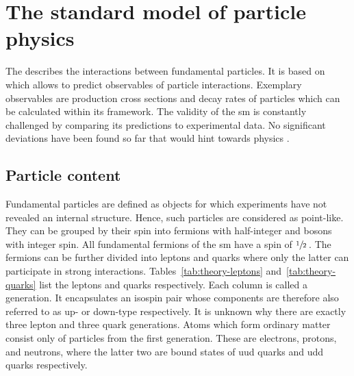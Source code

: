 \chapter{The standard model of particle physics}
\label{ch:theory}


The  describes the interactions between fundamental particles. It is based on  which allows to predict observables of particle interactions. Exemplary observables are production cross sections and decay rates of particles which can be calculated within its framework. The validity of the \gls{sm} is constantly challenged by comparing its predictions to experimental data. No significant deviations have been found so far that would hint towards physics .


\section{Particle content}

Fundamental particles are defined as objects for which experiments have not revealed an internal structure. Hence, such particles are considered as point-like. They can be grouped by their spin into fermions with half-integer and bosons with integer spin. All fundamental fermions of the \gls{sm} have a spin of $\sfrac{1}{2}\,$. The fermions can be further divided into leptons and quarks where only the latter can participate in strong interactions. Tables~\ref{tab:theory-leptons} and~\ref{tab:theory-quarks} list the leptons and quarks respectively. Each column is called a generation. It encapsulates an isospin pair whose components are therefore also referred to as up- or down-type respectively. It is unknown why there are exactly three lepton and three quark generations. Atoms which form ordinary matter consist only of particles from the first generation. These are electrons, protons, and neutrons, where the latter two are bound states of uud quarks and udd quarks respectively.

